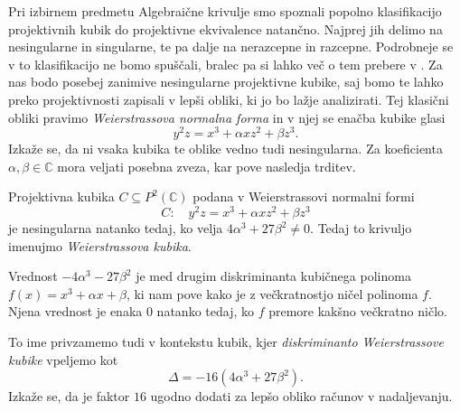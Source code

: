 \documentclass[mat1]{fmfdelo}
\numberwithin{equation}{section}
\newcommand{\C}{\mathbb C}
\newcommand{\PC}{P^2(\mathbb C)}
\theoremstyle{definition}
\begin{document}
Pri izbirnem predmetu Algebraične krivulje smo spoznali popolno klasifikacijo projektivnih kubik do projektivne ekvivalence natančno. Najprej jih delimo na nesingularne in singularne, te pa dalje na nerazcepne in razcepne. Podrobneje se v to klasifikacijo ne bomo spuščali, bralec pa si lahko več o tem prebere v \cite[poglavje 15]{Gibson}.
Za nas bodo posebej zanimive nesingularne projektivne kubike, saj bomo te lahko preko projektivnosti zapisali v lepši obliki, ki jo bo lažje analizirati. Tej klasični obliki pravimo \emph{Weierstrassova normalna forma} in v njej se enačba kubike glasi 
\begin{equation}
    \label{klasicna wnf}
    y^2z = x^3 + \alpha xz^2 + \beta z^3. 
\end{equation}
Izkaže se, da ni vsaka kubika te oblike vedno tudi nesingularna. Za koeficienta $\alpha, \beta \in \C$ mora veljati posebna zveza, kar pove nasledja trditev.

\begin{trditev}
    \label{kriterij za singularnost wnf}
    Projektivna kubika $C \subseteq \PC$ podana v Weierstrassovi normalni formi
    \[
        C: \quad y^2z = x^3 + \alpha xz^2 + \beta z^3
    \]
    je nesingularna natanko tedaj, ko velja $4\alpha^3 + 27\beta^2 \neq 0$. Tedaj to krivuljo imenujmo \emph{Weierstrassova kubika}. 

\end{trditev}

\begin{opomba}
    Vrednost $-4\alpha^3 - 27\beta^2$ je med drugim diskriminanta kubičnega polinoma $f(x) = x^3 + \alpha x + \beta$, ki nam pove kako je z večkratnostjo ničel polinoma $f$. Njena vrednost je enaka $0$ natanko tedaj, ko $f$ premore kakšno večkratno ničlo. 
    
    To ime privzamemo tudi v kontekstu kubik, kjer \emph{diskriminanto Weierstrassove kubike} vpeljemo kot
    \[
        \Delta = -16(4\alpha^3 + 27\beta^2).
    \]
    Izkaže se, da je faktor $16$ ugodno dodati za lepšo obliko računov v nadaljevanju. 

    

\end{opomba}
\end{document}
